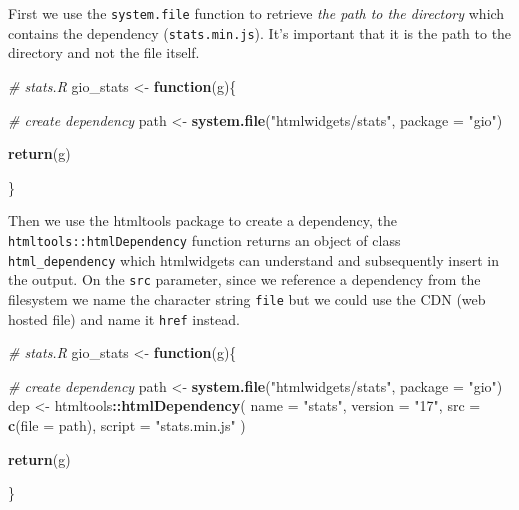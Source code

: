\documentclass[
]{krantz}
\makeatletter
\newenvironment{Shaded}{\begin{snugshade}}{\end{snugshade}}
\newcommand{\CommentTok}[1]{\textcolor[rgb]{0.37,0.37,0.37}{\textit{#1}}}
\newcommand{\ControlFlowTok}[1]{\textcolor[rgb]{0.27,0.27,0.27}{\textbf{#1}}}
\newcommand{\DataTypeTok}[1]{\textcolor[rgb]{0.27,0.27,0.27}{#1}}
\newcommand{\KeywordTok}[1]{\textcolor[rgb]{0.27,0.27,0.27}{\textbf{#1}}}
\newcommand{\NormalTok}[1]{#1}
\newcommand{\OperatorTok}[1]{\textcolor[rgb]{0.43,0.43,0.43}{\textbf{#1}}}
\newcommand{\StringTok}[1]{\textcolor[rgb]{0.5,0.5,0.5}{#1}}
\newenvironment{kframe}{%
\medskip{}
\setlength{\fboxsep}{.8em}
 \def\at@end@of@kframe{}%
 \ifinner\ifhmode%
  \def\at@end@of@kframe{\end{minipage}}%
  \begin{minipage}{\columnwidth}%
 \fi\fi%
 \def\FrameCommand##1{\hskip\@totalleftmargin \hskip-\fboxsep
 \colorbox{shadecolor}{##1}\hskip-\fboxsep
     \hskip-\linewidth \hskip-\@totalleftmargin \hskip\columnwidth}%
 \MakeFramed {\advance\hsize-\width
   \@totalleftmargin\z@ \linewidth\hsize
   \@setminipage}}%
 {\par\unskip\endMakeFramed%
 \at@end@of@kframe}
\renewenvironment{Shaded}{\begin{kframe}}{\end{kframe}}
\makeatother
\begin{document}
First we use the \texttt{system.file} function to retrieve \emph{the path to the directory} which contains the dependency (\texttt{stats.min.js}). It's important that it is the path to the directory and not the file itself.

\begin{Shaded}
\begin{Highlighting}[]
\CommentTok{\# stats.R}
\NormalTok{gio\_stats \textless{}{-}}\StringTok{ }\ControlFlowTok{function}\NormalTok{(g)\{}

  \CommentTok{\# create dependency}
\NormalTok{  path \textless{}{-}}\StringTok{ }\KeywordTok{system.file}\NormalTok{(}\StringTok{"htmlwidgets/stats"}\NormalTok{, }\DataTypeTok{package =} \StringTok{"gio"}\NormalTok{)}

  \KeywordTok{return}\NormalTok{(g)}

\NormalTok{\}}
\end{Highlighting}
\end{Shaded}

Then we use the htmltools package to create a dependency, the \texttt{htmltools::htmlDependency} function returns an object of class \texttt{html\_dependency} which htmlwidgets can understand and subsequently insert in the output. On the \texttt{src} parameter, since we reference a dependency from the filesystem we name the character string \texttt{file} but we could use the CDN (web hosted file) and name it \texttt{href} instead.

\begin{Shaded}
\begin{Highlighting}[]
\CommentTok{\# stats.R}
\NormalTok{gio\_stats \textless{}{-}}\StringTok{ }\ControlFlowTok{function}\NormalTok{(g)\{}

  \CommentTok{\# create dependency}
\NormalTok{  path \textless{}{-}}\StringTok{ }\KeywordTok{system.file}\NormalTok{(}\StringTok{"htmlwidgets/stats"}\NormalTok{, }\DataTypeTok{package =} \StringTok{"gio"}\NormalTok{)}
\NormalTok{  dep \textless{}{-}}\StringTok{ }\NormalTok{htmltools}\OperatorTok{::}\KeywordTok{htmlDependency}\NormalTok{(}
    \DataTypeTok{name =} \StringTok{"stats"}\NormalTok{,}
    \DataTypeTok{version =} \StringTok{"17"}\NormalTok{,}
    \DataTypeTok{src =} \KeywordTok{c}\NormalTok{(}\DataTypeTok{file =}\NormalTok{ path),}
    \DataTypeTok{script =} \StringTok{"stats.min.js"}
\NormalTok{  )}

  \KeywordTok{return}\NormalTok{(g)}

\NormalTok{\}}
\end{Highlighting}
\end{Shaded}
\end{document}
